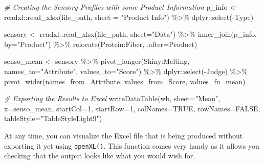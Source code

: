 \documentclass[
]{krantz}
\makeatletter
\newenvironment{Shaded}{\begin{snugshade}}{\end{snugshade}}
\newcommand{\AttributeTok}[1]{\textcolor[rgb]{0.61,0.61,0.61}{#1}}
\newcommand{\CommentTok}[1]{\textcolor[rgb]{0.37,0.37,0.37}{\textit{#1}}}
\newcommand{\ConstantTok}[1]{\textcolor[rgb]{0,0,0}{#1}}
\newcommand{\DecValTok}[1]{\textcolor[rgb]{0.06,0.06,0.06}{#1}}
\newcommand{\FunctionTok}[1]{\textcolor[rgb]{0,0,0}{#1}}
\newcommand{\NormalTok}[1]{#1}
\newcommand{\OtherTok}[1]{\textcolor[rgb]{0.37,0.37,0.37}{#1}}
\newcommand{\SpecialCharTok}[1]{\textcolor[rgb]{0,0,0}{#1}}
\newcommand{\StringTok}[1]{\textcolor[rgb]{0.5,0.5,0.5}{#1}}
\newenvironment{kframe}{%
\medskip{}
\setlength{\fboxsep}{.8em}
 \def\at@end@of@kframe{}%
 \ifinner\ifhmode%
  \def\at@end@of@kframe{\end{minipage}}%
  \begin{minipage}{\columnwidth}%
 \fi\fi%
 \def\FrameCommand##1{\hskip\@totalleftmargin \hskip-\fboxsep
 \colorbox{shadecolor}{##1}\hskip-\fboxsep
     \hskip-\linewidth \hskip-\@totalleftmargin \hskip\columnwidth}%
 \MakeFramed {\advance\hsize-\width
   \@totalleftmargin\z@ \linewidth\hsize
   \@setminipage}}%
 {\par\unskip\endMakeFramed%
 \at@end@of@kframe}
\renewenvironment{Shaded}{\begin{kframe}}{\end{kframe}}
\makeatother
\begin{document}
\begin{Shaded}
\begin{Highlighting}[]
\CommentTok{\# Creating the Sensory Profiles with some Product Information}
\NormalTok{p\_info }\OtherTok{\textless{}{-}}\NormalTok{ readxl}\SpecialCharTok{::}\FunctionTok{read\_xlsx}\NormalTok{(file\_path, }\AttributeTok{sheet =} \StringTok{"Product Info"}\NormalTok{) }\SpecialCharTok{\%\textgreater{}\%} 
\NormalTok{  dplyr}\SpecialCharTok{::}\FunctionTok{select}\NormalTok{(}\SpecialCharTok{{-}}\NormalTok{Type)}

\NormalTok{sensory }\OtherTok{\textless{}{-}}\NormalTok{ readxl}\SpecialCharTok{::}\FunctionTok{read\_xlsx}\NormalTok{(file\_path, }\AttributeTok{sheet=}\StringTok{"Data"}\NormalTok{) }\SpecialCharTok{\%\textgreater{}\%} 
  \FunctionTok{inner\_join}\NormalTok{(p\_info, }\AttributeTok{by=}\StringTok{"Product"}\NormalTok{) }\SpecialCharTok{\%\textgreater{}\%} 
  \FunctionTok{relocate}\NormalTok{(Protein}\SpecialCharTok{:}\NormalTok{Fiber, }\AttributeTok{.after=}\NormalTok{Product)}

\NormalTok{senso\_mean }\OtherTok{\textless{}{-}}\NormalTok{ sensory }\SpecialCharTok{\%\textgreater{}\%} 
  \FunctionTok{pivot\_longer}\NormalTok{(Shiny}\SpecialCharTok{:}\NormalTok{Melting, }\AttributeTok{names\_to=}\StringTok{"Attribute"}\NormalTok{, }\AttributeTok{values\_to=}\StringTok{"Score"}\NormalTok{) }\SpecialCharTok{\%\textgreater{}\%} 
\NormalTok{  dplyr}\SpecialCharTok{::}\FunctionTok{select}\NormalTok{(}\SpecialCharTok{{-}}\NormalTok{Judge) }\SpecialCharTok{\%\textgreater{}\%} 
  \FunctionTok{pivot\_wider}\NormalTok{(}\AttributeTok{names\_from=}\NormalTok{Attribute, }\AttributeTok{values\_from=}\NormalTok{Score, }\AttributeTok{values\_fn=}\NormalTok{mean)}

\CommentTok{\# Exporting the Results to Excel}
\FunctionTok{writeDataTable}\NormalTok{(wb, }\AttributeTok{sheet=}\StringTok{"Mean"}\NormalTok{, }\AttributeTok{x=}\NormalTok{senso\_mean, }\AttributeTok{startCol=}\DecValTok{1}\NormalTok{, }\AttributeTok{startRow=}\DecValTok{1}\NormalTok{, }\AttributeTok{colNames=}\ConstantTok{TRUE}\NormalTok{, }\AttributeTok{rowNames=}\ConstantTok{FALSE}\NormalTok{, }\AttributeTok{tableStyle=}\StringTok{"TableStyleLight9"}\NormalTok{)}
\end{Highlighting}
\end{Shaded}

At any time, you can visualize the Excel file that is being produced without exporting it yet using \texttt{openXL()}. This function comes very handy as it allows you checking that the output looks like what you would wish for.
\end{document}
